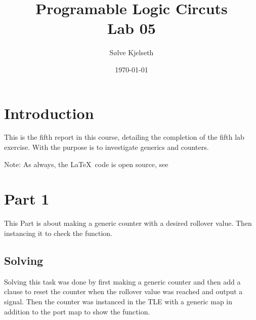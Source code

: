 \documentclass{article}
\title{\fontsize{24}{36}\selectfont Programable Logic Circuts\\ %
Lab 05} %
\author{{\ttfamily Sølve Kjelseth}} %
\date{\today} %
\begin{document}
\maketitle %



\section{Introduction} %
This is the fifth report in this course, detailing the completion of the fifth lab exercise. With the purpose is to investigate generics and counters.\par
Note: As always, the \LaTeX\ code is open source, see
\clearpage
\tableofcontents %
\clearpage
\listoffigures %



\section{Part 1}
This Part is about making a generic counter with a desired rollover value. Then instancing it to check the function.


\subsection{Solving}
Solving this task was done by first making a generic counter and then add a clause to reset the counter when the rollover value was reached and output a signal. Then the counter was instanced in the TLE with a generic map in addition to the port map to show the function.
\end{document}
